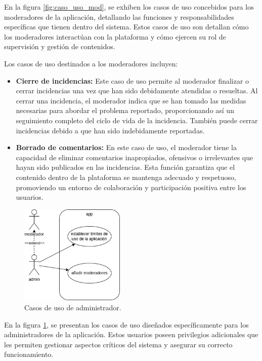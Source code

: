 \documentclass{article}
\begin{document}
En la figura \ref{fig:caso_uso_mod}, se exhiben los casos de uso concebidos para los moderadores de la aplicación, detallando las funciones y responsabilidades específicas que tienen dentro del sistema. Estos casos de uso son detallan cómo los moderadores interactúan con la plataforma y cómo ejercen su rol de supervisión y gestión de contenidos.

Los casos de uso destinados a los moderadores incluyen:

\begin{itemize}
    \item \textbf{Cierre de incidencias:} Este caso de uso permite al moderador finalizar o cerrar incidencias una vez que han sido debidamente atendidas o resueltas. Al cerrar una incidencia, el moderador indica que se han tomado las medidas necesarias para abordar el problema reportado, proporcionando así un seguimiento completo del ciclo de vida de la incidencia. También puede cerrar incidencias debido a que han sido indebidamente reportadas.
    
    \item \textbf{Borrado de comentarios:} En este caso de uso, el moderador tiene la capacidad de eliminar comentarios inapropiados, ofensivos o irrelevantes que hayan sido publicados en las incidencias. Esta función garantiza que el contenido dentro de la plataforma se mantenga adecuado y respetuoso, promoviendo un entorno de colaboración y participación positiva entre los usuarios.
\end{itemize}

\begin{figure}[H]
    \center
    \includegraphics[width=5cm]{images/caso_de_uso_admin.png}
    \caption{Casos de uso de administrador.}
    \label{fig:caso_uso_admin}
\end{figure}

En la figura \ref{fig:caso_uso_admin}, se presentan los casos de uso diseñados específicamente para los administradores de la aplicación. Estos usuarios poseen privilegios adicionales que les permiten gestionar aspectos críticos del sistema y asegurar su correcto funcionamiento.
\end{document}
